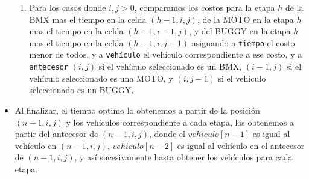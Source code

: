 \begin{itemize}
\begin{enumerate}
    \item Para los casos donde $i,j > 0$, comparamos los costos para la etapa $h$ de la BMX mas el tiempo en la celda $(h-1,i,j)$, de la MOTO en la etapa $h$ mas el tiempo en la celda $(h-1,i-1,j)$, y del BUGGY en la etapa $h$ mas el tiempo en la celda $(h-1,i,j-1)$  asignando a \texttt{tiempo} el costo menor de todos, y a \texttt{vehículo} el vehículo correspondiente a ese costo, y a \texttt{antecesor} $(i,j)$ si el vehículo seleccionado es un BMX, $(i-1,j)$ si el vehículo seleccionado es una MOTO, y $(i,j-1)$ si el vehículo seleccionado es un BUGGY.
  \end{enumerate}
  \item Al finalizar, el tiempo optimo lo obtenemos a partir de la posición $(n-1,i,j)$ y los vehículos correspondiente a cada etapa, los obtenemos a partir del antecesor de $(n-1,i,j)$, donde el $vehiculo[n-1]$ es igual al vehículo en $(n-1,i,j)$, $vehiculo[n-2]$ es igual al vehículo en el antecesor de $(n-1,i,j)$, y así sucesivamente hasta obtener los vehículos para cada etapa.
 \end{itemize}

